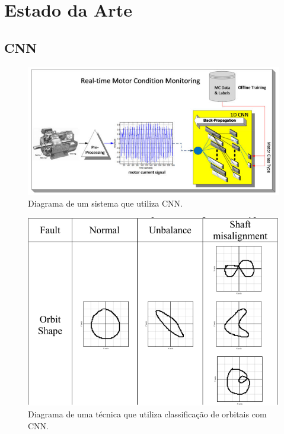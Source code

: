 % 

\section{Estado da Arte}


% 

\subsection{CNN}

\begin{figure}[H]
    \caption{Diagrama de um sistema que utiliza CNN.}
    \begin{center}
        \includegraphics[scale=.45]{referencial/img/cnn_ince_p2.png}
    \end{center}
    \label{fig:cnn_ince_p2}
\end{figure}


\begin{figure}[H]
    \caption{Diagrama de uma técnica que utiliza classificação de orbitais com CNN.}
    \begin{center}
        \includegraphics[scale=.45]{referencial/img/orbit_jeong_p3.png}
    \end{center}
    \label{fig:orbit_jeong_p3}
\end{figure}

